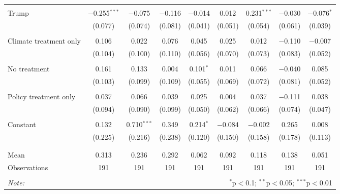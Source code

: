 \begin{tabular}{@{\extracolsep{5pt}}lcccccccc}
  & & & & & & & & \\ 
 Trump & $-$0.255$^{***}$ & $-$0.075 & $-$0.116 & $-$0.014 & 0.012 & 0.231$^{***}$ & $-$0.030 & $-$0.076$^{*}$ \\ 
  & (0.077) & (0.074) & (0.081) & (0.041) & (0.051) & (0.054) & (0.061) & (0.039) \\ 
  & & & & & & & & \\ 
 Climate treatment only & 0.106 & 0.022 & 0.076 & 0.045 & 0.025 & 0.012 & $-$0.110 & $-$0.007 \\ 
  & (0.104) & (0.100) & (0.110) & (0.056) & (0.070) & (0.073) & (0.083) & (0.052) \\ 
  & & & & & & & & \\ 
 No treatment & 0.161 & 0.133 & 0.004 & 0.101$^{*}$ & 0.011 & 0.066 & $-$0.040 & 0.085 \\ 
  & (0.103) & (0.099) & (0.109) & (0.055) & (0.069) & (0.072) & (0.081) & (0.052) \\ 
  & & & & & & & & \\ 
 Policy treatment only & 0.037 & 0.066 & 0.039 & 0.025 & 0.004 & 0.037 & $-$0.111 & 0.038 \\ 
  & (0.094) & (0.090) & (0.099) & (0.050) & (0.062) & (0.066) & (0.074) & (0.047) \\ 
  & & & & & & & & \\ 
 Constant & 0.132 & 0.710$^{***}$ & 0.349 & 0.214$^{*}$ & $-$0.084 & $-$0.002 & 0.265 & 0.008 \\ 
  & (0.225) & (0.216) & (0.238) & (0.120) & (0.150) & (0.158) & (0.178) & (0.113) \\ 
  & & & & & & & & \\ 
\hline \\[-1.8ex] 
Mean & 0.313 & 0.236 & 0.292 & 0.062 & 0.092 & 0.118 & 0.138 & 0.051 \\ 
Observations & 191 & 191 & 191 & 191 & 191 & 191 & 191 & 191 \\ 
\hline 
\hline \\[-1.8ex] 
\textit{Note:}  & \multicolumn{8}{r}{$^{*}$p$<$0.1; $^{**}$p$<$0.05; $^{***}$p$<$0.01} \\ 
\end{tabular} 
